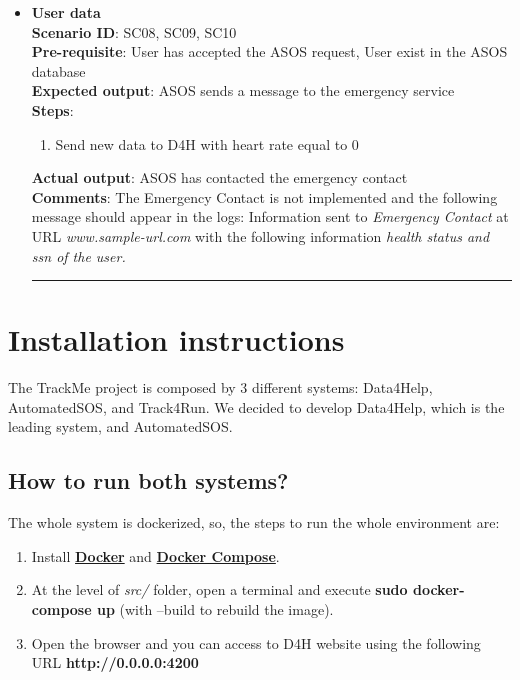 \documentclass[a4paper, hidelinks, 12pt]{report}
\begin{document}
\begin{itemize}
		\item{\textbf{User data}} \\
		\textbf{Scenario ID}: SC08, SC09, SC10 \\
		\textbf{Pre-requisite}: User has accepted the ASOS request, User exist in the ASOS database \\
		\textbf{Expected output}: ASOS sends a message to the emergency service\\
		\textbf{Steps}:
		\begin{enumerate}
			\item{Send new data to D4H with heart rate equal to 0}
		\end{enumerate}
		\textbf{Actual output}: ASOS has contacted the emergency contact \\
		\textbf{Comments}: The Emergency Contact is not implemented and the following message should appear in the logs: Information sent to \textit{Emergency Contact} at URL \textit{www.sample-url.com} with the following information \textit{health status and ssn of the user.}\\
		\rule{\linewidth}{0.4pt}
\end{itemize}

	\chapter{Installation instructions}
The TrackMe project is composed by 3 different systems: Data4Help, AutomatedSOS, and Track4Run. We decided to develop Data4Help, which is the leading system, and AutomatedSOS.

	\section{How to run both systems?}
	The whole system is dockerized, so, the steps to run the whole environment are:

	\begin{enumerate}
	\item Install \href{https://docs.docker.com/install/}{\textbf{Docker}} and \href{https://docs.docker.com/compose/install/}{\textbf{Docker Compose}}.
	\item At the level of \textit{src/} folder, open a terminal and execute
	\textbf{sudo docker-compose up} (with --build to rebuild the image).
	\item Open the browser and you can access to D4H website using the following URL
		\textbf{http://0.0.0.0:4200}
	\end{enumerate}
	
\end{document}
